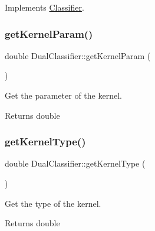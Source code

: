 Implements \hyperlink{class_classifier_a7bfe7cc88b851b4a7e7ec55b30dd844e}{Classifier}.

\mbox{\label{class_dual_classifier_a5738038f99450f5f3b7098d3125ffaae}} 
\subsubsection{\texorpdfstring{get\+Kernel\+Param()}{getKernelParam()}}
{\footnotesize\ttfamily double Dual\+Classifier\+::get\+Kernel\+Param (\begin{DoxyParamCaption}{ }\end{DoxyParamCaption})\hspace{0.3cm}{\ttfamily [inline]}}



Get the parameter of the kernel. 

\begin{DoxyReturn}{Returns}
double 
\end{DoxyReturn}
\mbox{\label{class_dual_classifier_a14b35e85dddac38e7927cd03037e2353}} 
\subsubsection{\texorpdfstring{get\+Kernel\+Type()}{getKernelType()}}
{\footnotesize\ttfamily double Dual\+Classifier\+::get\+Kernel\+Type (\begin{DoxyParamCaption}{ }\end{DoxyParamCaption})\hspace{0.3cm}{\ttfamily [inline]}}



Get the type of the kernel. 

\begin{DoxyReturn}{Returns}
double 
\end{DoxyReturn}
\mbox{\label{class_dual_classifier_a2ff6033df59ac6071300e603d0dcb7e1}} 
